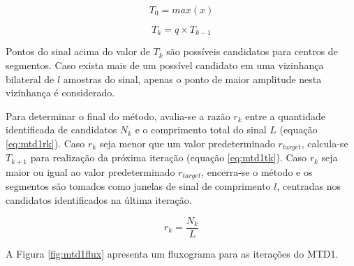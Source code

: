 \documentclass[
	12pt,				%
	openright,			%
	oneside,
	a4paper,			%
	english,			%
	francais,			%
	spanish,			%
	brazil				%
	]{abntex2}
\begin{document}
\begin{equation}
\label{eq:mtd1t0}
  T_0 = max(x)
\end{equation}

\begin{equation}
\label{eq:mtd1tk}
  T_k = q \times T_{k-1}
\end{equation}

	Pontos do sinal acima do valor de $T_k$ são possíveis candidatos para centros de segmentos. Caso exista mais de um possível candidato em uma vizinhança bilateral de $l$ amostras do sinal, apenas o ponto de maior amplitude nesta vizinhança é considerado.
	
	Para determinar o final do método, avalia-se a razão $r_k$ entre a quantidade identificada de candidatos $N_{k}$ e o comprimento total do sinal $L$ (equação \ref{eq:mtd1rk}). Caso $r_k$ seja menor que um valor predeterminado $r_{target}$, calcula-se $T_{k+1}$ para realização da próxima iteração (equação \ref{eq:mtd1tk}). Caso $r_k$ seja maior ou igual ao valor predeterminado $r_{target}$, encerra-se o método e os segmentos são tomados como janelas de sinal de comprimento $l$, centradas nos candidatos identificados na última iteração.
	
\begin{equation}
\label{eq:mtd1rk}
  r_k = \frac{N_{k}}{L} 
\end{equation}
	
	A Figura \ref{fig:mtd1flux} apresenta um fluxograma para as iterações do MTD1.
	
	
\end{document}
